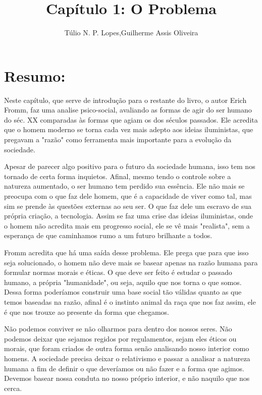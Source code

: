 \documentclass[12pt]{article}
\title{Capítulo 1: O Problema}
\author{Túlio N. P. Lopes\inst{1},Guilherme Assis Oliveira\inst{1}}
\begin{document}
 
	
	\maketitle
	\section{Resumo:}
	
	
	Neste capítulo, que serve de introdução para o restante do livro, o autor Erich Fromm, faz uma analise psico-social, avaliando as formas de agir do ser humano do séc. XX comparadas às formas que agiam os dos séculos passados. Ele acredita que o homem moderno se torna cada vez mais adepto aos ideias iluministas, que pregavam a "razão" como ferramenta mais importante para a evolução da sociedade.
	
	Apesar de parecer algo positivo para o futuro da sociedade humana, isso tem nos tornado de certa forma inquietos. Afinal,  mesmo tendo o controle sobre a natureza aumentado, o ser humano tem perdido sua essência. Ele não mais se preocupa com o que faz dele homem, que é a capacidade de viver como tal, mas sim se prende às questões externas ao seu ser. O que faz dele um escravo de sua própria criação, a tecnologia. Assim se faz uma crise das ideias iluministas, onde o homem não acredita mais em progresso social, ele se vê mais "realista", sem a esperança de que caminhamos rumo a um futuro brilhante a todos.
	
	Fromm acredita que há uma saída desse problema. Ele prega que para que isso seja solucionado, o homem não deve mais se basear apenas na razão humana para formular normas morais e éticas. O que deve ser feito é estudar o passado humano, a própria "humanidade", ou seja, aquilo que nos torna o que somos. Dessa forma poderíamos construir uma base social tão válidas quanto as que temos baseadas na razão, afinal é o instinto animal da raça que nos faz assim, ele é que nos trouxe ao presente da forma que chegamos.
	
	Não podemos conviver se não olharmos para dentro dos nossos seres. Não podemos deixar que sejamos regidos por regulamentos, sejam eles éticos ou morais, que foram criados de outra forma senão analisando nosso interior como homens. A sociedade precisa deixar o relativismo e passar a analisar a natureza humana a fim de definir o que deveríamos ou não fazer e a forma que agimos. Devemos basear nossa conduta no nosso próprio interior, e não naquilo que nos cerca. 
	
\end{document}
